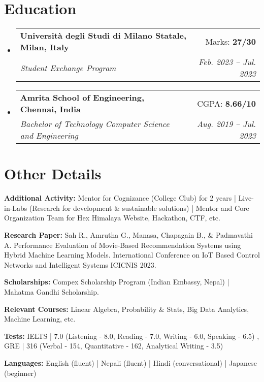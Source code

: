 \documentclass[a4paper,11pt]{article}
\makeatletter
\newcommand{\resumeSubheading}[4]{
  \vspace{-2pt}\item
    \begin{tabular*}{0.97\textwidth}[t]{l@{\extracolsep{\fill}}r}
      \textbf{#1} & #2 \\
      \textit{\small#3} & \textit{\small #4} \\
    \end{tabular*}\vspace{-7pt}
}
\newcommand{\resumeSubHeadingListStart}{\begin{itemize}[leftmargin=0.15in, label={}]}
\newcommand{\resumeSubHeadingListEnd}{\end{itemize}}
\makeatother
\begin{document}
\section{Education}
\resumeSubHeadingListStart
\resumeSubheading
{Università degli Studi di Milano Statale, Milan, Italy}{Marks: \textbf{27/30} }
{Student Exchange Program}{Feb. 2023 -- Jul. 2023}
\resumeSubheading
{Amrita School of Engineering, Chennai, India}{CGPA: \textbf{8.66/10}}
{Bachelor of Technology Computer Science and Engineering}{Aug. 2019 -- Jul. 2023}
\resumeSubHeadingListEnd

\section{Other Details}
\begin{itemize}[leftmargin=0.15in, label={}]
	\setlength\itemsep{-2pt}
	\small{\item{
		\textbf{Additional Activity:}{ Mentor for Cognizance (College Club) for 2 years | Live-in-Labs (Research for development \& sustainable solutions) | Mentor and Core Organization Team for Hex Himalaya Website, Hackathon, CTF, etc.} \\
		}
		\item{
		      \textbf{Research Paper:}{ Sah R., Amrutha G., Manasa, Chapagain B., \& Padmavathi A. Performance Evaluation of Movie-Based Recommendation Systems using Hybrid Machine Learning Models. International Conference on IoT Based Control Networks and Intelligent Systems ICICNIS 2023.
		      	} \\
		}
		\item{
		      \textbf{Scholarships:}{ Compex Scholarship Program (Indian Embassy, Nepal) | Mahatma Gandhi Scholarship.} \\
		}
		\item{
		      \textbf{Relevant Courses:}{ Linear Algebra, Probability \& Stats, Big Data Analytics, Machine Learning, etc.} \\
		}
		\item{
		      \textbf{Tests:}{ IELTS | 7.0 (Listening - 8.0, Reading - 7.0, Writing - 6.0, Speaking - 6.5) , GRE | 316 (Verbal - 154, Quantitative - 162, Analytical Writing - 3.5)} \\
		}
		\item{
		      \textbf{Languages:}{ English (fluent) | Nepali (fluent) | Hindi (conversational) | Japanese (beginner)}
	}}
\end{itemize}

\end{document}
